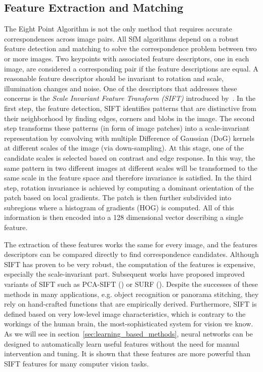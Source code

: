 		\subsection{Feature Extraction and Matching}
			The Eight Point Algorithm is not the only method that requires accurate correspondences across image pairs.
			All SfM algorithms depend on a robust feature detection and matching to solve the correspondence problem between two or more images.
			Two keypoints with associated feature descriptors, one in each image, are considered a corresponding pair if the feature descriptions are equal.
			A reasonable feature descriptor should be invariant to rotation and scale, illumination changes and noise.
			One of the descriptors that addresses these concerns is the \emph{Scale Invariant Feature Transform (SIFT)} introduced by~\cite{lowe1999object}.
			In the first step, the feature detection, SIFT identifies patterns that are distinctive from their neighborhood by finding edges, corners and blobs in the image.
			The second step transforms these patterns (in form of image patches) into a scale-invariant representation by convolving with multiple Difference of Gaussian (DoG) kernels at different scales of the image (via down-sampling).
			At this stage, one of the candidate scales is selected based on contrast and edge response.
			In this way, the same pattern in two different images at different scales will be transformed to the same scale in the feature space and therefore invariance is satisfied.
			In the third step, rotation invariance is achieved by computing a dominant orientation of the patch based on local gradients.
			The patch is then further subdivided into subregions where a histogram of gradients (HOG) is computed.
			All of this information is then encoded into a 128 dimensional vector describing a single feature.
			
			The extraction of these features works the same for every image, and the features descriptors can be compared directly to find correspondence candidates.
			Although SIFT has proven to be very robust, the computation of the features is expensive, especially the scale-invariant part.
			Subsequent works have proposed improved variants of SIFT such as PCA-SIFT (\cite{ke2004pca}) or SURF (\cite{bay2006surf}).
			Despite the successes of these methods in many applications, e.g. object recognition or panorama stitching, they rely on hand-crafted functions that are empirically derived.
			Furthermore, SIFT is defined based on very low-level image characteristics, which is contrary to the workings of the human brain, the most-sophisticated system for vision we know.
			As we will see in section~\ref{sec:learning_based_methods}, neural networks can be designed to automatically learn useful features without the need for manual intervention and tuning.
			It is shown that these features are more powerful than SIFT features for many computer vision tasks.
			
